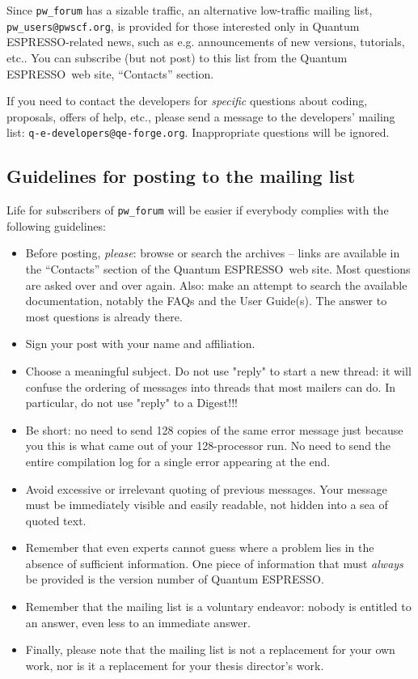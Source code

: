 \documentclass[12pt,a4paper]{article}
\def\qe{{\sc Quantum ESPRESSO}}
\begin{document}
Since \texttt{pw\_forum} has a sizable traffic, an alternative
low-traffic mailing list, \texttt{pw\_users@pwscf.org}, is provided for
those interested only in \qe-related news, such as e.g. announcements 
of new versions, tutorials, etc.. You can subscribe (but not post) to 
this list from the \qe\ web site, ``Contacts'' section.

If you need to contact the developers for {\em specific} questions 
about coding, proposals, offers of help, etc., please send a message
to the developers' mailing list: \texttt{q-e-developers@qe-forge.org}.
Inappropriate questions will be ignored.

\subsection{Guidelines for posting to the mailing list}
\label{SubSec:Guidelines}
Life for subscribers of \texttt{pw\_forum} will be easier if everybody 
complies with the following guidelines:
\begin{itemize}
\item Before posting, {\em please}: browse or search the archives -- 
  links are available in the ``Contacts'' section  of the \qe\ web site.
  Most questions are asked over and over again. Also: make an attempt
  to search the
  available documentation, notably the FAQs and the User Guide(s).
  The answer to most questions is already there.
\item Sign your post with your name and affiliation.
\item Choose a meaningful subject. Do not use "reply" to start a new
  thread:
  it will confuse the ordering of messages into threads that most mailers
  can do. In particular, do not use "reply" to a Digest!!!
\item Be short: no need to send 128 copies of the same error message just
  because you this is what came out of your 128-processor run. No need to
  send the entire compilation log for a single error appearing at the end.
\item Avoid excessive or irrelevant quoting of previous messages. Your
  message must be immediately visible and easily readable, not hidden
  into a sea of quoted text.
\item Remember that even experts cannot guess where a problem lies in
  the absence of sufficient information. One piece of information that
  must {\em always} be provided is the version number of \qe.
\item Remember that the mailing list is a voluntary endeavor: nobody is 
  entitled to an answer, even less to an immediate answer.
\item Finally, please note that the mailing list is not a replacement
  for your own work, nor is it a replacement for your thesis director's 
  work.
\end{itemize}
 
\end{document}
